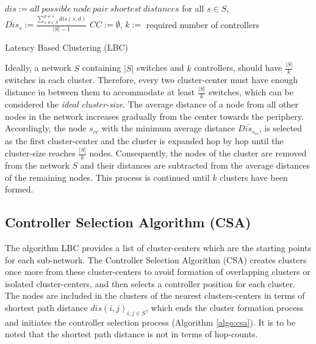 \documentclass[preprint,12pt]{elsarticle}
\begin{document}
	\begin{algorithm}
		\SetAlgoLined
		$dis := all~possible~node~pair~shortest~distances$\;
		for all $s\in S$, $\overline{Dis}_s := \frac{\sum_{s,d \in S}^{d \ne s}dis(s,d)}{|S|-1}$\;
		$CC := \emptyset$, $k :=$ required number of controllers\;
		\caption{Latency Based Clustering (LBC)} \label{algo:lbc}
	\end{algorithm}
	Ideally, a network $S$ containing $|S|$ switches and $k$ controllers, should have $\frac{|S|}{k}$ switches in each cluster. Therefore, every two cluster-center must have enough distance in between them to accommodate at least $\frac{|S|}{k}$ switches, which can be considered the \textit{ideal cluster-size}. The average distance of a node from all other nodes in the network increases gradually from the center towards the periphery. Accordingly, the node $s_{cc}$ with the minimum average distance $\overline{Dis_{s_{cc}}}$, is selected as the first cluster-center and the cluster is expanded hop by hop until the cluster-size reaches $\frac{|S|}{k}$ nodes. Consequently, the nodes of the cluster are removed from the network $S$ and their distances are subtracted from the average distances of the remaining nodes. This process is continued until $k$ clusters have been formed.
	
	\subsection{Controller Selection Algorithm (CSA)} \label{csa}
	
	The algorithm LBC provides a list of cluster-centers which are the starting points for each sub-network. The Controller Selection Algorithm (CSA) creates clusters once more from these cluster-centers to avoid formation of overlapping clusters or isolated cluster-centers, and then selects a controller position for each cluster. The nodes are included in the clusters of the nearest clusters-centers in terms of shortest path distance $dis(i,j)_{i,j \in S}$, which ends the cluster formation process and initiates the controller selection process (Algorithm \ref{algo:csa}). It is to be noted that the shortest path distance is not in terms of hop-counts.
	
\end{document}
